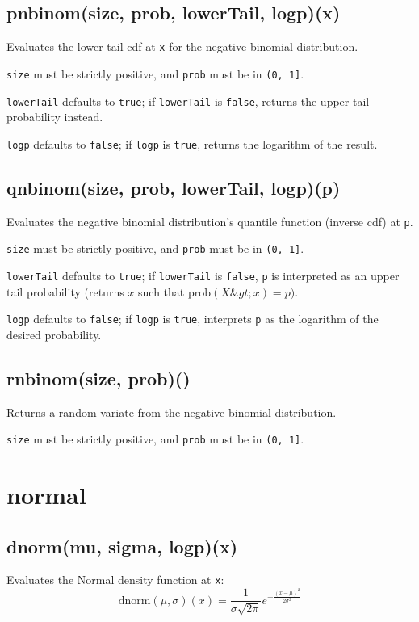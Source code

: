 \documentclass{article}
\begin{document}
    \subsection*{pnbinom(size, prob, lowerTail, logp)(x)}
    Evaluates the lower-tail cdf at \texttt{x} for the negative binomial distribution.


\texttt{size} must be strictly positive, and \texttt{prob} must be in \texttt{(0, 1]}.


\texttt{lowerTail} defaults to \texttt{true}; if \texttt{lowerTail} is \texttt{false}, returns
the upper tail probability instead.


\texttt{logp} defaults to \texttt{false}; if \texttt{logp} is \texttt{true}, returns the logarithm
of the result.


    \subsection*{qnbinom(size, prob, lowerTail, logp)(p)}
    Evaluates the negative binomial distribution's quantile function
(inverse cdf) at \texttt{p}.


\texttt{size} must be strictly positive, and \texttt{prob} must be in \texttt{(0, 1]}.


\texttt{lowerTail} defaults to \texttt{true}; if \texttt{lowerTail} is \texttt{false}, \texttt{p} is
interpreted as an upper tail probability (returns
$x$ such that $\textrm{prob}(X \&gt; x) = p)$.


\texttt{logp} defaults to \texttt{false}; if \texttt{logp} is \texttt{true}, interprets \texttt{p} as
the logarithm of the desired probability.


    \subsection*{rnbinom(size, prob)()}
    Returns a random variate from the negative binomial distribution.


\texttt{size} must be strictly positive, and \texttt{prob} must be in \texttt{(0, 1]}.


  \section{normal}
    \subsection*{dnorm(mu, sigma, logp)(x)}
    Evaluates the Normal density function at \texttt{x}:
$$\textrm{dnorm}(\mu, \sigma)(x) = \frac{1}{\sigma \sqrt{2\pi}} e^{\displaystyle -\frac{(x-\mu)^2}{2\sigma^2}}$$
\end{document}
